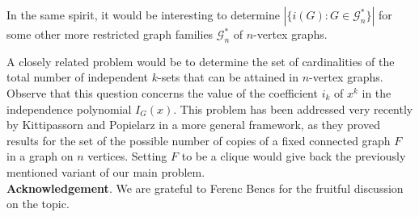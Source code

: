 \documentclass[10pt,a4paper]{article}
\numberwithin{equation}{section}
\newcommand{\cG}{\mathcal{G}}
\begin{document}
In the same spirit, it would be interesting to determine   $|\{ i(G): G\in \cG_n^*\}|$ for some other more restricted graph families $\cG_n^*$ of $n$-vertex graphs.

A closely related problem would be to determine the set of cardinalities of the total number of independent $k$-sets that can be attained in $n$-vertex graphs. Observe that this question concerns the value of the coefficient $i_k$ of $x^k$ in the independence polynomial $I_G(x)$. This problem has been addressed very recently by Kittipassorn and Popielarz \cite{Kitti} in a more general framework, as they  proved results for the set of the possible number of copies of a fixed connected graph $F$ in a graph on $n$ vertices. Setting $F$ to be a clique would give back the previously mentioned variant of our main problem.\\

\noindent \textbf{Acknowledgement}.
We are grateful to Ferenc Bencs for the fruitful discussion on the topic.
\end{document}
